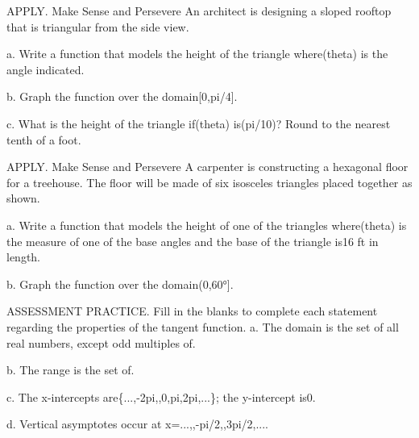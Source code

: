 \documentclass{article}
\newenvironment{practice}[2]{}{}        %
\newcommand{\answer}[1]{}               %
\newcommand{\placeholder}[2]{}          %
\begin{document}
\begin{practice}{21}{2}
APPLY. Make Sense and Persevere An architect is designing a sloped rooftop that is triangular from the side view.
\placeholder{illustration}{Side view of building with sloped roof rising left to right. Right triangleoutlined onwooden gable, horizontalbase12ft,rightanglelowerright,angle theta lowerleft,skylight inroof;blue sky and birds.}
a. Write a function that models the height of the triangle where(theta) is the angle indicated.
\answer{a.(h=12\tan\theta)}
b. Graph the function over the domain[0,pi/4].
\answer{b.Graph shown.}
\placeholder{graph}{Red12tan theta curve from(0,0) to(pi/4,12),no endpoint circles; unlabeled arrowed positive axes; horizontalgridpi/16 labels0,pi/8,pi/4;verticalgrid3 labels0,6,12;window0..5pi/16,0..15.}
c. What is the height of the triangle if(theta) is(pi/10)? Round to the nearest tenth of a foot.
\answer{c.approximately3.9 ft}
\end{practice}
\begin{practice}{22}{2}
APPLY. Make Sense and Persevere A carpenter is constructing a hexagonal floor for a treehouse. The floor will be made of six isosceles triangles placed together as shown.
\placeholder{illustration}{Underview ofhexagonal wooden treehousefloor aroundcentral tree,greenfoliage. Six triangular floorsegments,one outlinedwhite onright,outerbase16ft withdimensionarrow,angle theta atlowerrightbasecorner.}
a. Write a function that models the height of one of the triangles where(theta) is the measure of one of the base angles and the base of the triangle is16 ft in length.
\answer{a.(h=8\tan\theta)}
b. Graph the function over the domain(0,60°].
\answer{b.Graph shown.}
\placeholder{graph}{Red8tan theta withtheta degrees,unlabeled arrowedpositiveaxes; horizontalgrid5 labeled0,20,40;verticalgrid1 labeled0,2,4,6,8;window0..50,0..10. Curve fromorigin increasing toabout(50,9.5),upperrightarrow;printed plot stops before60degree domain endpoint.}
\end{practice}
\begin{practice}{23}{2}
ASSESSMENT PRACTICE. Fill in the blanks to complete each statement regarding the properties of the tangent function.
a. The domain is the set of all real numbers, except odd multiples of\underline{\hspace{1cm}}.
\answer{a.(\pi/2)}
b. The range is the set of\underline{\hspace{1cm}}.
\answer{b.all real numbers}
c. The x-intercepts are\{...,-2pi,\underline{\hspace{1cm}},0,pi,2pi,\underline{\hspace{1cm}}...\}; the y-intercept is0.
\answer{c.(-\pi),(3\pi)}
d. Vertical asymptotes occur at x=...,\underline{\hspace{1cm}},-pi/2,\underline{\hspace{1cm}},3pi/2,....
\answer{d.(-3\pi/2),(\pi/2)}
\end{practice}
\end{document}
